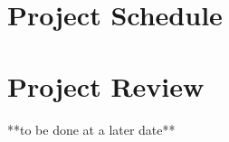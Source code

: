 \documentclass{article}
\begin{document}
\section{Project Schedule}



\section{Project Review}
**to be done at a later date**
\end{document}

